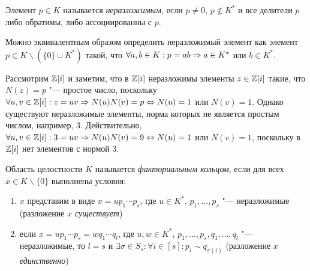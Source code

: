 \begin{definition}
	Элемент $p \in K$ называется \textit{неразложимым}, если $p \ne 0$, $p \not\in K^*$ и все делители $p$ либо обратимы, либо ассоциированны с $p$.
\end{definition}

\begin{note}
	Можно эквивалентным образом определить неразложимый элемент как элемент $p \in K \backslash (\{0\} \cup K^*)$ такой, что $\forall a, b \in K: p = ab \Rightarrow a \in K^*$ или $b \in K^*$.
\end{note}

\begin{example}
	Рассмотрим $\mathbb{Z}[i]$ и заметим, что в $\mathbb{Z}[i]$ неразложимы элементы $z \in \mathbb{Z}[i]$ такие, что $N(z) = p$ "--- простое число, поскольку $\forall u, v \in \mathbb{Z}[i]: z = uv \Rightarrow N(u)N(v) = p \Leftrightarrow N(u) = 1$ или $N(v) = 1$. Однако существуют неразложимые элементы, норма которых не является простым числом, например, 3. Действительно, $\forall u, v \in \Z[i]: 3 = uv \ra N(u)N(v) = 9 \hm\lra N(u) = 1$ или $N(v) = 1$, поскольку в $\mathbb{Z}[i]$ нет элементов с нормой 3.
\end{example}

\begin{definition}
	Область целостности $K$ называется \textit{факториальным кольцом}, если для всех $x \in K \backslash \{0\}$ выполнены условия:
	\begin{enumerate}
		\item $x$ представим в виде $x = up_1\dotsm p_s$, где $u \in K^*$, $p_1, \dotsc, p_s$ "--- неразложимые (разложение $x$ \textit{существует})
		\item если $x = up_1\dotsm p_s = wq_1 \dotsm q_l$, где $u, w \in K^*$, $p_1, \dotsc, p_s, q_1, \dotsc, q_l$ "--- неразложимые, то $l = s$ и $\exists \sigma \in S_s: \forall i \in [s]: p_i \sim q_{\sigma(i)}$ (разложение $x$ \textit{единственно})
	\end{enumerate}
\end{definition}


